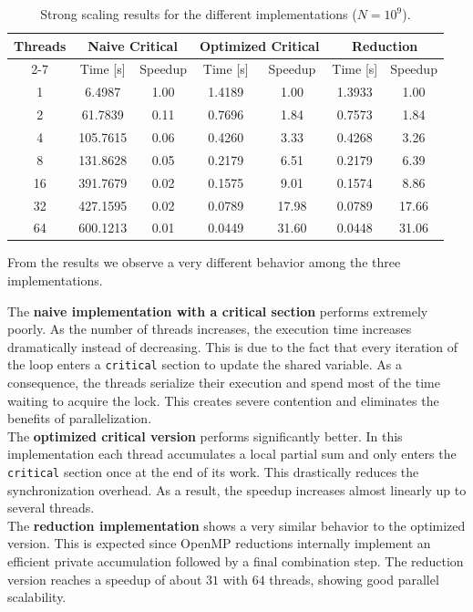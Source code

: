 \documentclass[unicode,10pt,a4paper,oneside,numbers=endperiod,openany]{scrartcl}
\begin{document}
\begin{table}[!h]
\centering
\caption{Strong scaling results for the different implementations ($N=10^9$).}
\label{tab:strong_scaling}
\begin{tabular}{ccccccc}
\hline
\multirow{2}{*}{Threads} & 
\multicolumn{2}{c}{Naive Critical} &
\multicolumn{2}{c}{Optimized Critical} &
\multicolumn{2}{c}{Reduction} \\
\cline{2-7}
 & Time [s] & Speedup & Time [s] & Speedup & Time [s] & Speedup \\
\hline
1  & 6.4987 & 1.00 & 1.4189 & 1.00 & 1.3933 & 1.00 \\
2  & 61.7839 & 0.11 & 0.7696 & 1.84 & 0.7573 & 1.84 \\
4  & 105.7615 & 0.06 & 0.4260 & 3.33 & 0.4268 & 3.26 \\
8  & 131.8628 & 0.05 & 0.2179 & 6.51 & 0.2179 & 6.39 \\
16 & 391.7679 & 0.02 & 0.1575 & 9.01 & 0.1574 & 8.86 \\
32 & 427.1595 & 0.02 & 0.0789 & 17.98 & 0.0789 & 17.66 \\
64 & 600.1213 & 0.01 & 0.0449 & 31.60 & 0.0448 & 31.06 \\
\hline
\end{tabular}
\end{table}

From the results we observe a very different behavior among the three implementations.

The \textbf{naive implementation with a critical section} performs extremely poorly. As the number of threads increases, the execution time increases dramatically instead of decreasing. This is due to the fact that every iteration of the loop enters a \texttt{critical} section to update the shared variable. As a consequence, the threads serialize their execution and spend most of the time waiting to acquire the lock. This creates severe contention and eliminates the benefits of parallelization.\\

The \textbf{optimized critical version} performs significantly better. In this implementation each thread accumulates a local partial sum and only enters the \texttt{critical} section once at the end of its work. This drastically reduces the synchronization overhead. As a result, the speedup increases almost linearly up to several threads.\\

The \textbf{reduction implementation} shows a very similar behavior to the optimized version. This is expected since OpenMP reductions internally implement an efficient private accumulation followed by a final combination step. The reduction version reaches a speedup of about $31$ with $64$ threads, showing good parallel scalability.
\end{document}
